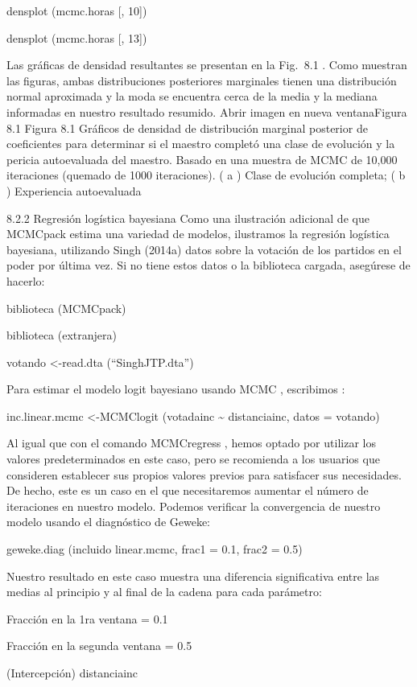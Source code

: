 \documentclass[
]{book}
\begin{document}
densplot (mcmc.horas {[}, 10{]})

densplot (mcmc.horas {[}, 13{]})

Las gráficas de densidad resultantes se presentan en la Fig.  8.1 . Como muestran las figuras, ambas distribuciones posteriores marginales tienen una distribución normal aproximada y la moda se encuentra cerca de la media y la mediana informadas en nuestro resultado resumido.
Abrir imagen en nueva ventanaFigura 8.1
Figura 8.1
Gráficos de densidad de distribución marginal posterior de coeficientes para determinar si el maestro completó una clase de evolución y la pericia autoevaluada del maestro. Basado en una muestra de MCMC de 10,000 iteraciones (quemado de 1000 iteraciones). ( a ) Clase de evolución completa; ( b ) Experiencia autoevaluada

8.2.2 Regresión logística bayesiana
Como una ilustración adicional de que MCMCpack estima una variedad de modelos, ilustramos la regresión logística bayesiana, utilizando Singh (2014a) datos sobre la votación de los partidos en el poder por última vez. Si no tiene estos datos o la biblioteca cargada, asegúrese de hacerlo:

biblioteca (MCMCpack)

biblioteca (extranjera)

votando \textless-read.dta (``SinghJTP.dta'')

Para estimar el modelo logit bayesiano usando MCMC , escribimos :

inc.linear.mcmc \textless-MCMClogit (votadainc \textasciitilde{} distanciainc, datos = votando)

Al igual que con el comando MCMCregress , hemos optado por utilizar los valores predeterminados en este caso, pero se recomienda a los usuarios que consideren establecer sus propios valores previos para satisfacer sus necesidades. De hecho, este es un caso en el que necesitaremos aumentar el número de iteraciones en nuestro modelo. Podemos verificar la convergencia de nuestro modelo usando el diagnóstico de Geweke:

geweke.diag (incluido linear.mcmc, frac1 = 0.1, frac2 = 0.5)

Nuestro resultado en este caso muestra una diferencia significativa entre las medias al principio y al final de la cadena para cada parámetro:

Fracción en la 1ra ventana = 0.1

Fracción en la segunda ventana = 0.5

(Intercepción) distanciainc
\end{document}
